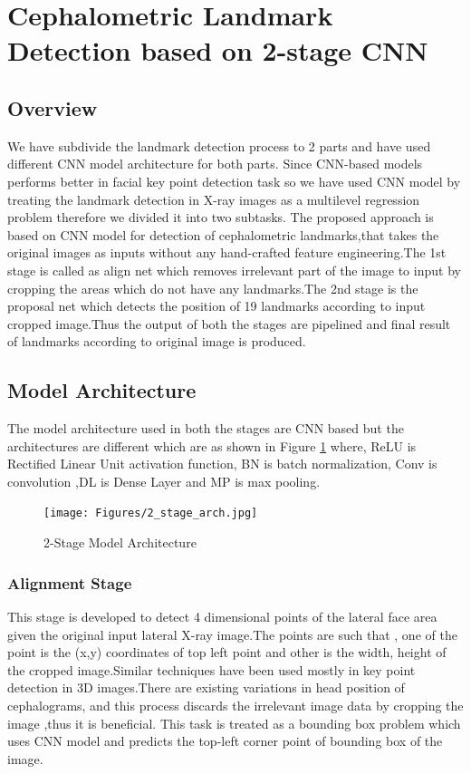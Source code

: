 \documentclass[sn-mathphys]{sn-jnl}%
\theoremstyle{thmstyleone}%
\theoremstyle{thmstyletwo}%
\theoremstyle{thmstylethree}%
\begin{document}
\section{Cephalometric Landmark Detection based on 2-stage CNN}\label{non_augment_2_stage_CNN}
\subsection{Overview}

We have subdivide the landmark detection process to 2 parts and have used different CNN model architecture for both parts. Since CNN-based models performs better in facial key point detection task so we have used CNN model by treating the landmark detection in X-ray images as a multilevel regression problem therefore we divided it into two subtasks. The proposed approach is based on CNN model for detection of cephalometric landmarks,that takes the original images as inputs without any hand-crafted feature engineering.The 1st stage is called as align net which removes irrelevant part of the image to input by cropping the areas which do not have any landmarks.The 2nd stage is the proposal net which detects the position of 19 landmarks according to input cropped image.Thus the output of both the stages are pipelined and final result of landmarks according to original image is produced.

\subsection{Model Architecture}
The model architecture used in both the stages are CNN based but the architectures are different which are as shown in Figure \ref{figure 5.1:2_stage_arch} where, ReLU is Rectified Linear Unit activation function, BN is batch normalization, Conv is convolution ,DL is Dense Layer and MP is max pooling.

\begin{figure}[htp]
    \centering
    \texttt{[image: Figures/2\_stage\_arch.jpg]}
    \caption{2-Stage Model Architecture }
    \label{figure 5.1:2_stage_arch}
\end{figure}

 \subsubsection{Alignment Stage}
 This stage is developed to detect 4 dimensional points  of the lateral face area given the original input lateral X-ray image.The  points are such that , one of the point is the (x,y) coordinates of top left point and other is the width, height  of the cropped image.Similar techniques have been used mostly in key point detection in 3D images.There are  existing variations in head position  of cephalograms, and this process discards the irrelevant image data by cropping the image ,thus it is beneficial. This task is treated as a bounding box problem which uses CNN model and predicts the top-left corner point of bounding box of the image.
\end{document}
